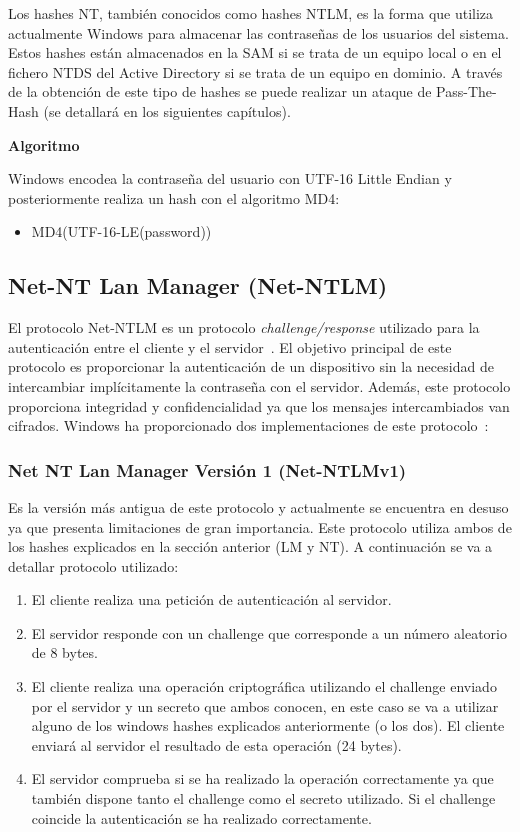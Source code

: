 Los hashes NT, también conocidos como hashes NTLM, es la forma que utiliza actualmente Windows para almacenar las contraseñas de los usuarios del sistema. Estos hashes están almacenados en la SAM si se trata de un equipo local o en el fichero NTDS del Active Directory si se trata de un equipo en dominio. A través de la obtención de este tipo de hashes se puede realizar un ataque de Pass-The-Hash (se detallará en los siguientes capítulos).

\textbf{Algoritmo}

Windows encodea la contraseña del usuario con UTF-16 Little Endian y posteriormente realiza un hash con el algoritmo MD4: 

\begin{itemize}
\item MD4(UTF-16-LE(password))
\end{itemize}

\subsection{Net-NT Lan Manager (Net-NTLM)}

El protocolo Net-NTLM es un protocolo {\it challenge/response} utilizado para la au\-ten\-ti\-ca\-ción entre el cliente y el servidor~\cite{Capitulo3:NTLM2}. El objetivo principal de este protocolo es proporcionar la au\-ten\-ti\-ca\-ción de un dispositivo sin la necesidad de intercambiar im\-plí\-ci\-ta\-men\-te la contraseña con el servidor. Además, este protocolo proporciona integridad y confidencialidad ya que los mensajes intercambiados van cifrados. Windows ha proporcionado dos implementaciones de este protocolo~\cite{Capitulo3:NTLANManager}:

\subsubsection{Net NT Lan Manager Versión 1 (Net-NTLMv1)}

Es la versión más antigua de este protocolo y actualmente se encuentra en desuso ya que presenta limitaciones de gran importancia. Este protocolo utiliza ambos de los hashes explicados en la sección anterior (LM y NT). A continuación se va a detallar protocolo utilizado:

\begin{enumerate}
\item El cliente realiza una petición de au\-ten\-ti\-ca\-ción al servidor.
\item El servidor responde con un challenge que corresponde a un número aleatorio de 8 bytes. 
\item El cliente realiza una operación criptográfica utilizando el challenge enviado por el servidor y un secreto que ambos conocen, en este caso se va a utilizar alguno de los windows hashes explicados anteriormente (o los dos). El cliente enviará al servidor el resultado de esta operación (24 bytes). 
\item El servidor comprueba si se ha realizado la operación correctamente ya que también dispone tanto el challenge como el secreto utilizado. Si el challenge coincide la au\-ten\-ti\-ca\-ción se ha realizado correctamente. 
\end{enumerate}

